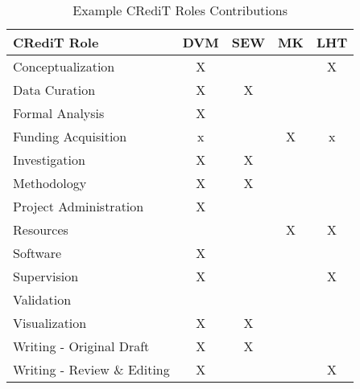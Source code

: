 \begin{table}[ht]
    \centering
    \caption{Example CRediT Roles Contributions}
    \begin{tabular}{@{}lcccc@{}}
    \toprule
    \textbf{CRediT Role}               & \textbf{DVM} & \textbf{SEW} & \textbf{MK} & \textbf{LHT} \\ \midrule
    Conceptualization                  & X               &                &                 &  X               \\
    Data Curation                      & X                & X               &                &                 \\
    Formal Analysis                    & X               &                 &                &                 \\
    Funding Acquisition                & x                &                & X                & x               \\
    Investigation                      & X               & X               &                 &                \\
    Methodology                        & X               & X                &                &                 \\
    Project Administration             & X                &                 &                &                \\
    Resources                          &                 &                & X                & X               \\
    Software                           & X               &                 &                &                 \\
    Supervision                        & X                &                 &                &  X               \\
    Validation                         &                &                 &                 &                \\
    Visualization                      & X               & X               &                 &                 \\
    Writing - Original Draft           & X               & X                &                &                 \\
    Writing - Review \& Editing        & X                &                &                & X               \\ \bottomrule
    \end{tabular}
    \label{tab:credit_roles}
\end{table}



